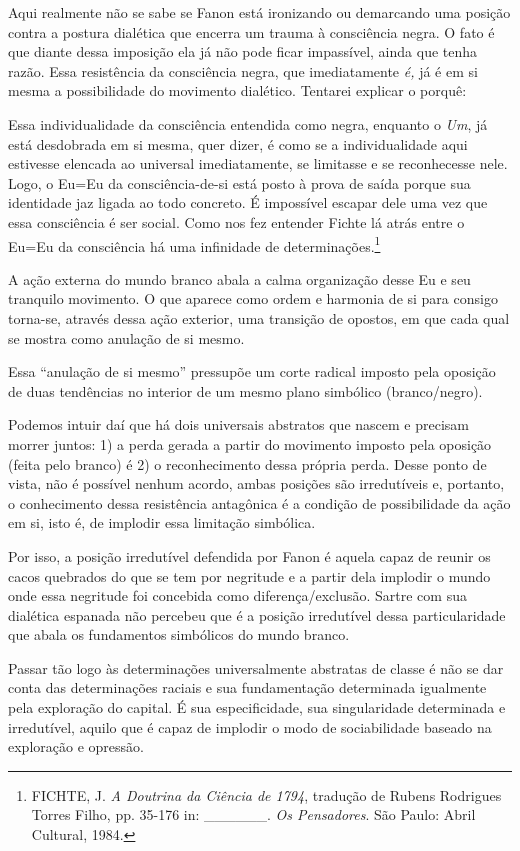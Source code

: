 Aqui realmente não se sabe se Fanon está ironizando ou demarcando uma
posição contra a postura dialética que encerra um trauma à consciência
negra. O fato é que diante dessa imposição ela já não pode ficar
impassível, ainda que tenha razão. Essa resistência da consciência
negra, que imediatamente \emph{é,} já é em si mesma a possibilidade do
movimento dialético. Tentarei explicar o porquê:

Essa individualidade da consciência entendida como negra, enquanto o
\emph{Um}, já está desdobrada em si mesma, quer dizer, é como se a
individualidade aqui estivesse elencada ao universal imediatamente, se
limitasse e se reconhecesse nele. Logo, o Eu=Eu da consciência-de-si
está posto à prova de saída porque sua identidade jaz ligada ao todo
concreto. É impossível escapar dele uma vez que essa consciência é ser
social. Como nos fez entender Fichte lá atrás entre o Eu=Eu da
consciência há uma infinidade de determinações.\footnote{FICHTE, J.
  \emph{A Doutrina da Ciência de 1794}, tradução de Rubens Rodrigues
  Torres Filho, pp. 35-176 in: \_\_\_\_\_\_. \emph{Os Pensadores}. São
  Paulo: Abril Cultural, 1984.}

A ação externa do mundo branco abala a calma organização desse Eu e seu
tranquilo movimento. O que aparece como ordem e harmonia de si para
consigo torna-se, através dessa ação exterior, uma transição de opostos,
em que cada qual se mostra como anulação de si mesmo.

Essa ``anulação de si mesmo'' pressupõe um corte radical imposto pela
oposição de duas tendências no interior de um mesmo plano simbólico
(branco/negro).

Podemos intuir daí que há dois universais abstratos que nascem e
precisam morrer juntos: 1) a perda gerada a partir do movimento imposto
pela oposição (feita pelo branco) é 2) o reconhecimento dessa própria
perda. Desse ponto de vista, não é possível nenhum acordo, ambas
posições são irredutíveis e, portanto, o conhecimento dessa resistência
antagônica é a condição de possibilidade da ação em si, isto é, de
implodir essa limitação simbólica.

Por isso, a posição irredutível defendida por Fanon é aquela capaz de
reunir os cacos quebrados do que se tem por negritude e a partir dela
implodir o mundo onde essa negritude foi concebida como
diferença/exclusão. Sartre com sua dialética espanada não percebeu que é
a posição irredutível dessa particularidade que abala os fundamentos
simbólicos do mundo branco.

Passar tão logo às determinações universalmente abstratas de classe é
não se dar conta das determinações raciais e sua fundamentação
determinada igualmente pela exploração do capital. É sua especificidade,
sua singularidade determinada e irredutível, aquilo que é capaz de
implodir o modo de sociabilidade baseado na exploração e opressão.


